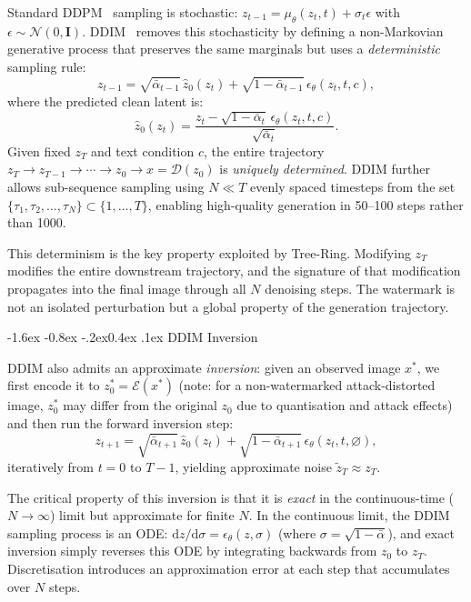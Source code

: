 \documentclass[10pt,twocolumn]{article}
\makeatletter
\renewcommand\subsection{\@startsection{subsection}{2}{\z@}%
  {-1.6ex \@plus -0.8ex \@minus -.2ex}{0.4ex \@plus .1ex}%
  {\normalfont\normalsize\itshape}}
\makeatother
\begin{document}
Standard DDPM~\cite{ho2020ddpm} sampling is stochastic:
$z_{t-1} = \mu_\theta(z_t, t) + \sigma_t \epsilon$ with
$\epsilon \sim \mathcal{N}(0,\mathbf{I})$.
DDIM~\cite{song2020ddim} removes this stochasticity by defining
a non-Markovian generative process that preserves the same marginals
but uses a \emph{deterministic} sampling rule:
\begin{equation}
  z_{t-1} = \sqrt{\bar\alpha_{t-1}}\,\hat{z}_0(z_t)
           + \sqrt{1-\bar\alpha_{t-1}}\,\epsilon_\theta(z_t,t,c),
  \label{eq:ddim}
\end{equation}
where the predicted clean latent is:
\begin{equation}
  \hat{z}_0(z_t) =
    \frac{z_t - \sqrt{1-\bar\alpha_t}\,\epsilon_\theta(z_t,t,c)}{\sqrt{\bar\alpha_t}}.
  \label{eq:z0hat}
\end{equation}
Given fixed $z_T$ and text condition $c$, the entire trajectory
$z_T \to z_{T-1} \to \cdots \to z_0 \to x = \mathcal{D}(z_0)$
is \emph{uniquely determined}.
DDIM further allows sub-sequence sampling using $N \ll T$ evenly
spaced timesteps from the set
$\{\tau_1, \tau_2, \ldots, \tau_N\} \subset \{1, \ldots, T\}$,
enabling high-quality generation in 50--100 steps rather than 1000.

This determinism is the key property exploited by Tree-Ring.
Modifying $z_T$ modifies the entire downstream trajectory, and the
signature of that modification propagates into the final image
through all $N$ denoising steps.
The watermark is not an isolated perturbation but a global property
of the generation trajectory.

\subsection{DDIM Inversion}

DDIM also admits an approximate \emph{inversion}: given an observed
image $x^*$, we first encode it to $z_0^* = \mathcal{E}(x^*)$
(note: for a non-watermarked attack-distorted image, $z_0^*$ may
differ from the original $z_0$ due to quantisation and attack effects)
and then run the forward inversion step:
\begin{equation}
  z_{t+1} = \sqrt{\bar\alpha_{t+1}}\,\hat{z}_0(z_t)
           + \sqrt{1-\bar\alpha_{t+1}}\,\epsilon_\theta(z_t,t,\varnothing),
  \label{eq:inversion}
\end{equation}
iteratively from $t{=}0$ to $T{-}1$, yielding approximate noise
$\tilde{z}_T \approx z_T$.

The critical property of this inversion is that it is \emph{exact}
in the continuous-time ($N \to \infty$) limit but approximate for
finite $N$.
In the continuous limit, the DDIM sampling process is an ODE:
$\mathrm{d}z/\mathrm{d}\sigma = \epsilon_\theta(z, \sigma)$ (where
$\sigma = \sqrt{1-\bar\alpha}$), and exact inversion simply reverses
this ODE by integrating backwards from $z_0$ to $z_T$.
Discretisation introduces an approximation error at each step that
accumulates over $N$ steps.
\end{document}
